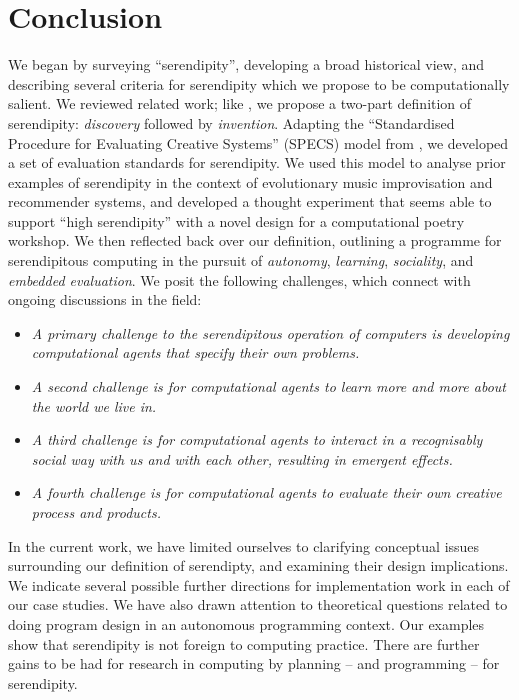 \section{Conclusion} \label{sec:conclusion}

%
We began by surveying ``serendipity'', developing a broad historical
view, and describing several criteria for serendipity which we propose
to be computationally salient.  We reviewed related work; like
, we propose a two-part definition of
serendipity: \emph{discovery} followed by \emph{invention}.
%
Adapting the ``Standardised Procedure for Evaluating Creative
Systems'' (SPECS) model from , we developed a set
of evaluation standards for serendipity.
%
We used this model to analyse prior examples of serendipity in the
context of evolutionary music improvisation and recommender systems,
and developed a thought experiment that seems able to support ``high
serendipity'' with a novel design for a computational poetry workshop.
%
We then reflected back over our definition, outlining a programme for
serendipitous computing in the pursuit of \emph{autonomy},
\emph{learning}, \emph{sociality}, and \emph{embedded evaluation}.  We
posit the following challenges, which connect with ongoing discussions
in the field:
%
\begin{itemize}
\item \emph{A primary challenge to the serendipitous operation of
  computers is developing computational agents that specify their own
  problems.}
\item \emph{A second challenge is for computational agents to learn
  more and more about the world we live in.}
\item \emph{A third challenge is for computational agents to interact
  in a recognisably social way with us and with each other, resulting
  in emergent effects.}
\item \emph{A fourth challenge is for computational agents to evaluate
  their own creative process and products.}
\end{itemize}
%
In the current work, we have limited ourselves to clarifying
conceptual issues surrounding our definition of serendipty, and
examining their design implications.
% 
We indicate several possible further directions for implementation
work in each of our case studies.  We have also drawn attention to
theoretical questions related to doing program design in an autonomous
programming context.  Our examples show that serendipity is not
foreign to computing practice.  There are further gains to be had for
research in computing by planning -- and programming -- for
serendipity.
%

